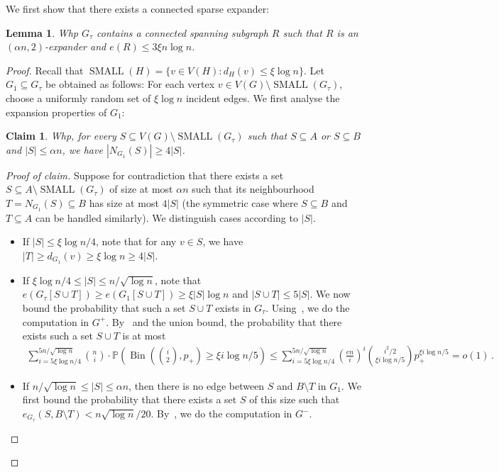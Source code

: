 \documentclass[reqno,final,a4paper]{amsart}
\numberwithin{equation}{section}
\newtheorem{lemma}[theorem]{Lemma}
\newtheorem{claim}[theorem]{Claim}
\theoremstyle{definition}
\theoremstyle{remark}
\renewcommand{\Pr}{\mathbb{P}}
\newcommand{\Bin}{\operatorname{Bin}}
\newcommand{\SMA}{\operatorname{SMALL}}
\newenvironment{proofclaim}[1][Proof of claim]{\begin{proof}[#1]\renewcommand*{\qedsymbol}{\(\blacksquare\)}}{\end{proof}}
\begin{document}
We first show that there exists a connected sparse expander:
\begin{lemma}\label{lem:sparse-expander-exists}
    Whp $G_\tau$ contains a connected spanning subgraph $R$ such that $R$ is an $(\alpha n,2)$-expander and $e(R)\leq 3 \xi n \log n$.
\end{lemma}
\begin{proof}
    Recall that $\SMA(H) = \{v\in V(H): d_{H}(v)\leq \xi \log n\}$. 
    Let $G_1\subseteq G_\tau$ be obtained as follows: For each vertex $v\in V(G)\setminus \SMA(G_\tau)$, choose a uniformly random set of $\xi\log n$ incident edges. 
    We first analyse the expansion properties of $G_1$:
    \begin{claim}\label{claim:4-expander}
        Whp, for every $S\subseteq V(G)\setminus \SMA(G_\tau)$ such that $S\subseteq A$ or $S\subseteq B$ and $|S|\leq \alpha n$, we have $|N_{G_1}(S)|\geq 4|S|$.
    \end{claim}
    \begin{proofclaim}
        Suppose for contradiction that there exists a set $S\subseteq A\setminus \SMA(G_\tau)$ of size at most $\alpha n$ such that its neighbourhood $T = N_{G_1}(S)\subseteq B$ has size at most $4|S|$ (the symmetric case where $S\subseteq B$ and $T\subseteq A$ can be handled similarly).
        We distinguish cases according to $|S|$. 
        \begin{itemize}
            \item If $|S|\leq \xi \log n/4$, note that for any $v\in S$, we have $|T|\geq d_{G_1}(v) \geq \xi \log n\geq 4|S|$. 
            \item If $\xi\log n/4\leq |S|\leq n/\sqrt{\log n}$, note that $e(G_\tau[S\cup T]) \geq e(G_1[S\cup T])\geq \xi|S|\log n$ and $|S\cup T|\leq 5|S|$. 
            We now bound the probability that such a set $S\cup T$ exists in $G_\tau$.
            Using~, we do the computation in $G^+$.
            By~ and the union bound, the probability that there exists such a set $S\cup T$ is at most
            \begin{multline*}
                \sum_{i= 5\xi\log n/4}^{5n/\sqrt{\log n}}\binom{n}{i}\cdot \Pr\left(\Bin\left(\binom{i}{2},p_+\right) \geq \xi i\log n/5\right)
                \leq \sum_{i= 5\xi\log n/4}^{5n/\sqrt{\log n}}\left(\frac{en}{i}\right)^i \binom{i^2/2}{\xi i\log n/5} p_+^{\xi i\log n/5} = o(1)\,.
            \end{multline*}
            \item If $n/\sqrt{\log n}\leq |S|\leq \alpha n$, then there is no edge between $S$ and $B\setminus T$ in $G_1$. 
            We first bound the probability that there exists a set $S$ of this size such that $e_{G_\tau}(S,B\setminus T)< n\sqrt{\log n}/20$.
            By~, we do the computation in $G^-$.
            

\end{itemize}
\end{proofclaim}
\end{proof}
\end{document}
